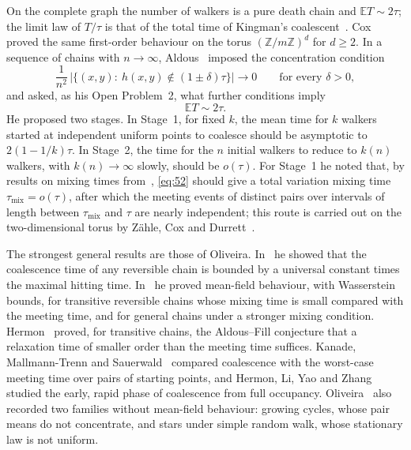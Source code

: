 \documentclass[11pt,a4paper]{article}
\numberwithin{equation}{section}
\theoremstyle{remark}
\newcommand{\E}{\mathbb E}
\begin{document}
On the complete graph the number of walkers is a pure death chain and $\E T\sim2\tau$; the limit law of $T/\tau$ is that of the total time of Kingman's coalescent~\cite[Chapter~14]{AF}. Cox~\cite{Cox89} proved the same first-order behaviour on the torus $(\mathbb Z/m\mathbb Z)^d$ for $d\ge2$. In a sequence of chains with $n\to\infty$, Aldous~\cite[Section~5.5]{Ald13} imposed the concentration condition
\begin{equation}\label{eq:52}
\frac1{n^2}\,\bigl|\{(x,y):\ h(x,y)\notin(1\pm\delta)\tau\}\bigr|\to0\qquad\text{for every }\delta>0,
\end{equation}
and asked, as his Open Problem~2, what further conditions imply
\begin{equation}\label{eq:53}
\E T\sim2\tau .
\end{equation}
He proposed two stages. In Stage~1, for fixed $k$, the mean time for $k$ walkers started at independent uniform points to coalesce should be asymptotic to $2(1-1/k)\tau$. In Stage~2, the time for the $n$ initial walkers to reduce to $k(n)$ walkers, with $k(n)\to\infty$ slowly, should be $o(\tau)$. For Stage~1 he noted that, by results on mixing times from~\cite{Ald82}, \eqref{eq:52} should give a total variation mixing time $\tau_{\mathrm{mix}}=o(\tau)$, after which the meeting events of distinct pairs over intervals of length between $\tau_{\mathrm{mix}}$ and $\tau$ are nearly independent; this route is carried out on the two-dimensional torus by Z\"ahle, Cox and Durrett~\cite{ZCD05}.

The strongest general results are those of Oliveira. In~\cite{Oli12} he showed that the coalescence time of any reversible chain is bounded by a universal constant times the maximal hitting time. In~\cite{Oli13} he proved mean-field behaviour, with Wasserstein bounds, for transitive reversible chains whose mixing time is small compared with the meeting time, and for general chains under a stronger mixing condition. Hermon~\cite{Her} proved, for transitive chains, the Aldous--Fill conjecture that a relaxation time of smaller order than the meeting time suffices. Kanade, Mallmann-Trenn and Sauerwald~\cite{KMS19} compared coalescence with the worst-case meeting time over pairs of starting points, and Hermon, Li, Yao and Zhang~\cite{HLYZ22} studied the early, rapid phase of coalescence from full occupancy. Oliveira~\cite{Oli13} also recorded two families without mean-field behaviour: growing cycles, whose pair means do not concentrate, and stars under simple random walk, whose stationary law is not uniform.
\end{document}
